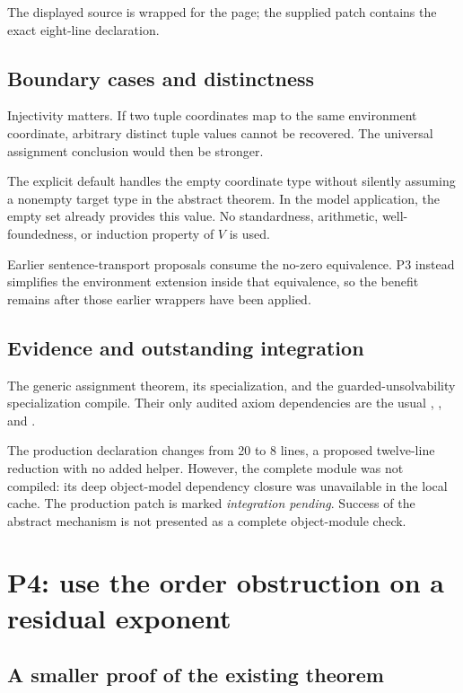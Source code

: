 The displayed source is wrapped for the page; the supplied patch contains
the exact eight-line declaration.

\subsection{Boundary cases and distinctness}

Injectivity matters. If two tuple coordinates map to the same environment
coordinate, arbitrary distinct tuple values cannot be recovered. The
universal assignment conclusion would then be stronger.

The explicit default handles the empty coordinate type without silently
assuming a nonempty target type in the abstract theorem. In the model
application, the empty set already provides this value. No standardness,
arithmetic, well-foundedness, or induction property of $V$ is used.

Earlier sentence-transport proposals consume the no-zero equivalence.
P3 instead simplifies the environment extension inside that equivalence,
so the benefit remains after those earlier wrappers have been applied.

\subsection{Evidence and outstanding integration}

The generic assignment theorem, its  specialization, and the
guarded-unsolvability specialization compile. Their only audited axiom
dependencies are the usual , , and
.

The production declaration changes from 20 to 8 lines, a proposed
twelve-line reduction with no added helper. However, the complete
 module was not compiled: its deep object-model
dependency closure was unavailable in the local cache. The production patch
is marked \emph{integration pending}. Success of the abstract mechanism is
not presented as a complete object-module check.

\section{P4: use the order obstruction on a residual exponent}

\subsection{A smaller proof of the existing theorem}

